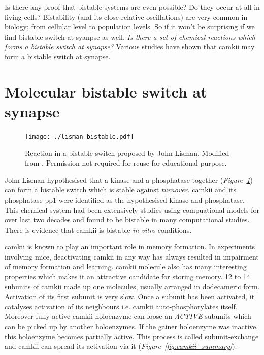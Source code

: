 \documentclass[]{resonance}
\newcommand\Fig[1]{\textit{Figure~\ref{#1}}}
\begin{document}
Is there any  proof that bistable systems are even possible? Do they occur at
all in living cells?  Bistability (and its close relative oscillations) are very
common in biology; from cellular level to population levels. So if it won't be
surprising if we find bistable switch at syanpse as well.  \emph{Is there a set
of chemical reactions which forms a bistable switch at synapse?} Various studies
have shown that \gls{camkii} may form a bistable switch at synapse.

\section{Molecular bistable switch at synapse}\label{sec:molecular_switch}

\begin{figure}[ht!]
    \centering
    \texttt{[image: ./lisman\_bistable.pdf]}
    \caption{Reaction in a bistable switch proposed by John Lisman. Modified
        from \cite{lisman1985}. Permission not required for reuse for
        educational purpose.
    }\label{fig:lisman}
\end{figure}

John Lisman hypothesised that a kinase and a phosphatase together
(\Fig{fig:lisman}) can form a bistable switch which is stable against
\emph{turnover}. \gls{camkii} and its phosphatase \gls{pp1} were identified as
the hypothesised kinase and phosphatase. This chemical system had been
extensively studies using compuational models for over last two decades
\cite{sandstorm} and found to be bistable in many computational studies. There
is evidence that \gls{camkii} is bistable \emph{in vitro} conditions. 

\gls{camkii} is known to  play an important role in memory formation.  In
experiments involving mice, deactivating \gls{camkii} in any way has always
resulted in impairment of memory formation and learning. \gls{camkii} molecule
also has many interesting properties which makes it an attractive candidate for
storing memory. 12 to 14 subunits of \gls{camkii} made up one molecules, usually
arranged in dodecameric form. Activation of its first subunit is very slow. Once
a subunit has been activated, it catalyses activation of its neighbours i.e.
\gls{camkii} auto-phosphorylates itself. Moreover fully active \gls{camkii}
holoenzyme can loose an \textit{ACTIVE} subunits which can be picked up by
another holoenzymes. If the gainer holoenzyme was inactive, this holoenzyme
becomes partially active. This process is called subunit-exchange and
\gls{camkii} can spread its activation via it (\Fig{fig:camkii_summary}).
\end{document}
